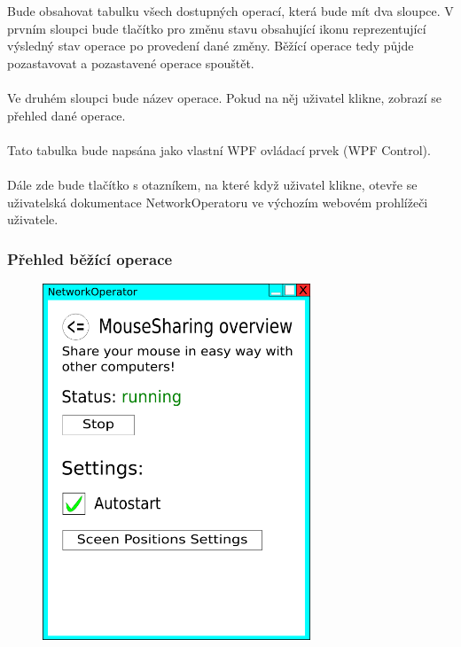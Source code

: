 \documentclass[12pt]{article}
\begin{document}
Bude obsahovat tabulku všech dostupných operací, která bude mít dva sloupce. V prvním sloupci bude tlačítko pro změnu stavu obsahující ikonu reprezentující výsledný stav operace po provedení dané změny. Běžící operace tedy půjde pozastavovat a pozastavené operace spouštět.\\\\
Ve druhém sloupci bude název operace. Pokud na něj uživatel klikne, zobrazí se přehled dané operace.\\\\
Tato tabulka bude napsána jako vlastní WPF ovládací prvek (WPF Control).\\\\
Dále zde bude tlačítko s otazníkem, na které když uživatel klikne, otevře se uživatelská dokumentace NetworkOperatoru ve výchozím webovém prohlížeči uživatele.

\subsubsection{Přehled běžící operace}
\begin{figure}[H]
\includegraphics[width=8cm]{gui3-mousesahring-overview-running.png}
\centering
\end{figure}
\end{document}
